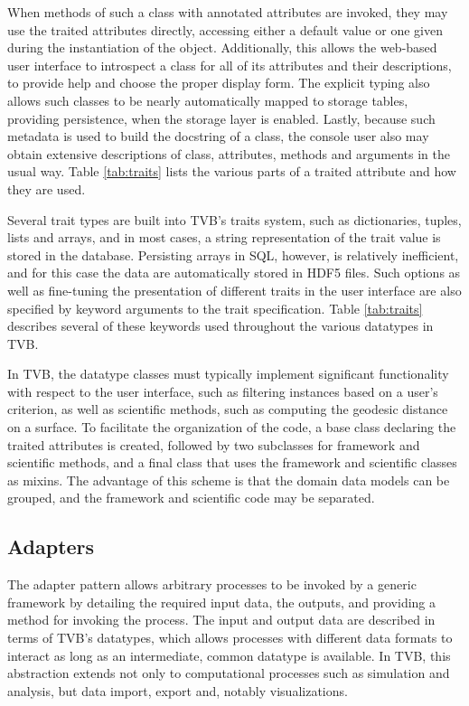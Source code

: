 \documentclass{bioinfo}
\begin{document}
When methods of such a class with annotated attributes are invoked, they may use
the traited attributes directly, accessing either a default value or one given
during the instantiation of the object. Additionally, this allows the web-based
user interface to introspect a class for all of its attributes and their
descriptions, to provide help and choose the proper display form. The explicit
typing also allows such classes to be nearly automatically mapped to storage
tables, providing persistence, when the storage layer is enabled.  Lastly,
because such metadata is used to build the docstring of a class, the console
user also may obtain extensive descriptions of class, attributes, methods and
arguments in the usual way. Table \ref{tab:traits} lists the various parts 
of a traited attribute and how they are used. 

Several trait types are built into TVB's traits system, such as dictionaries,
tuples, lists and arrays, and in most cases, a string representation of the
trait value is stored in the database.  Persisting arrays in SQL, however, is
relatively inefficient, and for this case the data are automatically stored in
HDF5 files. Such options as well as fine-tuning the presentation of different
traits in the user interface are also specified by keyword arguments to the
trait specification.  Table \ref{tab:traits} describes several of these
keywords used throughout the various datatypes in TVB.

In TVB, the datatype classes must typically implement significant functionality
with respect to the user interface, such as filtering instances based on a
user's criterion, as well as scientific methods, such as computing the geodesic
distance on a surface. To facilitate the organization of the code, a base class
declaring the traited attributes is created, followed by two subclasses for 
framework and scientific methods, and a final class that uses the framework and
scientific classes as mixins. The advantage of this scheme is that the domain 
data models can be grouped, and the framework and scientific code may be separated. 

\subsection{Adapters}

The adapter pattern allows arbitrary processes to be invoked by a generic 
framework by detailing the required input data, the outputs, and providing a
method for invoking the process. The input and output data are described in terms of 
TVB's datatypes, which allows processes with different data formats 
to interact as long as an intermediate, common datatype is available. In
TVB, this abstraction extends not only to computational processes such as 
simulation and analysis, but data import, export and, notably visualizations. 
\end{document}
